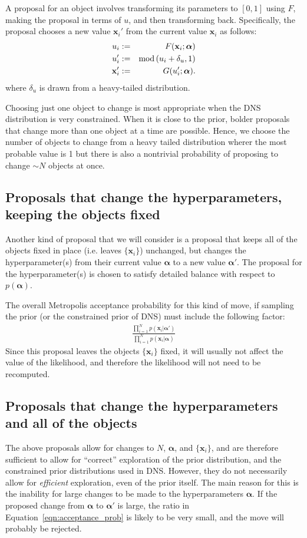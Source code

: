 \documentclass[letterpaper, 11pt]{article}
\newcommand{\hyperparams}{\boldsymbol{\alpha}}
\newcommand{\xx}{\mathbf{x}}
\begin{document}
A proposal
for an object involves transforming its parameters to $[0, 1]$ using $F$,
making the proposal in terms of $u$, and then transforming back.
Specifically, the proposal chooses
a new value $\xx_i'$ from the current value $\xx_i$ as follows:
\begin{eqnarray}
u_i &:=& F(\xx_i; \hyperparams)\\
u_i' &:=& \textnormal{mod}\left(u_i + \delta_u, 1\right)\\
\xx_i' &:=& G(u_i'; \hyperparams).
\end{eqnarray}
where $\delta_u$ is drawn from a heavy-tailed distribution.

Choosing just one object to change is most appropriate when the DNS
distribution is very constrained. When it is close to the prior, bolder
proposals that change more than one object at a time are possible. Hence,
we choose the number of objects to change from a heavy tailed distribution
wherer the most probable value is 1 but there is also a nontrivial probability
of proposing to change $\sim N$ objects at once.

\subsection{Proposals that change the hyperparameters,
keeping the objects fixed}\label{sec:proposal3}
Another kind of proposal that we will consider is a proposal that keeps all of
the objects fixed in place (i.e. leaves $\{\xx_i\}$) unchanged, but changes
the hyperparameter(s) from their current value $\hyperparams$
to a new value $\hyperparams'$. The proposal for the hyperparameter(s) is chosen
to satisfy detailed balance with respect to $p(\hyperparams)$.

The overall Metropolis acceptance probability
for this kind of move, if sampling the prior (or the constrained prior of DNS)
must include the following factor:
\begin{eqnarray}
\frac{\prod_{i=1}^N p(\xx_i | \hyperparams')}{\prod_{i=1}^N p(\xx_i | \hyperparams)}
\label{eqn:acceptance_prob}
\end{eqnarray}
Since this proposal leaves the objects $\{\xx_i\}$ fixed, it will usually not
affect the value of the likelihood, and therefore the likelihood will not need
to be recomputed.

\subsection{Proposals that change the hyperparameters
and all of the objects}\label{sec:proposal4}
The above proposals allow for changes to $N$, $\hyperparams$, and $\{\xx_i\}$,
and are therefore sufficient to allow for ``correct'' exploration of the
prior distribution, and the constrained prior distributions used in DNS.
However, they do not necessarily allow for {\it efficient} exploration, even
of the prior itself. The main reason for this is the inability for large
changes to be made to the hyperparameters $\hyperparams$. If the proposed change
from $\hyperparams$ to $\hyperparams'$ is large, the ratio in
Equation~\ref{eqn:acceptance_prob} is likely to be very small, and the move
will probably be rejected.
\end{document}
